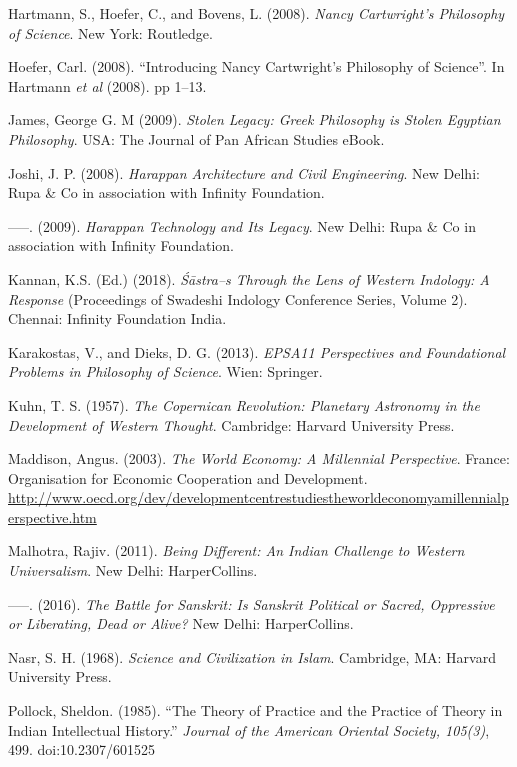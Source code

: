 \begin{thebibliography}{99}
  Hartmann, S., Hoefer, C., and Bovens, L. (2008). \textit{Nancy Cartwright's Philosophy of Science}. New York: Routledge.

  Hoefer, Carl. (2008). “Introducing Nancy Cartwright’s Philosophy of Science”. In Hartmann \textit{et al} (2008). pp 1–13.

  James, George G. M (2009). \textit{Stolen Legacy: Greek Philosophy is Stolen Egyptian Philosophy}. USA: The Journal of Pan African Studies eBook.

  Joshi, J. P. (2008). \textit{Harappan Architecture and Civil Engineering}. New Delhi: Rupa \& Co in association with Infinity Foundation.

  –––. (2009). \textit{Harappan Technology and Its Legacy}. New Delhi: Rupa \& Co in association with Infinity Foundation.

  Kannan, K.S. (Ed.) (2018). \textit{Śāstra–s Through the Lens of Western Indology: A Response} (Proceedings of Swadeshi Indology Conference Series, Volume 2). Chennai: Infinity Foundation India.

  Karakostas, V., and Dieks, D. G. (2013). \textit{EPSA11 Perspectives and Foundational Problems in Philosophy of Science}. Wien: Springer.

  Kuhn, T. S. (1957). \textit{The Copernican Revolution: Planetary Astronomy in the Development of Western Thought}. Cambridge: Harvard University Press.

  Maddison, Angus. (2003). \textit{The World Economy: A Millennial Perspective}. France: Organisation for Economic Cooperation and Development. \url{http://www.oecd.org/dev/developmentcentrestudiestheworldeconomyamillennialperspective.htm}

  Malhotra, Rajiv. (2011). \textit{Being Different: An Indian Challenge to Western Universalism}. New Delhi: HarperCollins.

  –––. (2016). \textit{The Battle for Sanskrit: Is Sanskrit Political or Sacred, Oppressive or Liberating, Dead or Alive?} New Delhi: HarperCollins.

  Nasr, S. H. (1968). \textit{Science and Civilization in Islam}. Cambridge, MA: Harvard University Press.

  Pollock, Sheldon. (1985). “The Theory of Practice and the Practice of Theory in Indian Intellectual History.” \textit{Journal of the American Oriental Society, 105(3)}, 499. doi:10.2307/601525


\end{thebibliography}
